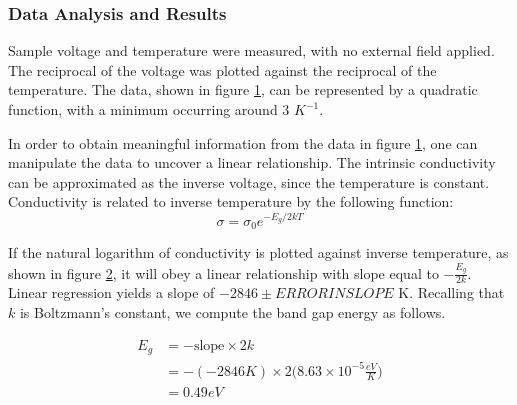 \documentclass[a4paper]{article}
\begin{document}
\subsubsection{Data Analysis and Results}
\qq Sample voltage and temperature were measured, with no external
field applied. The reciprocal of the voltage was plotted against the
reciprocal of the temperature. The data, shown in figure
\ref{task23plot}, can be represented by a quadratic function, with a
minimum occurring around 3 $K^{-1}$.

\begin{figure}[H]
\centering
\label{task23plot}
\end{figure}

\qq In order to obtain meaningful information from the data in figure
\ref{task23plot}, one can manipulate the data to uncover a linear
relationship. The intrinsic conductivity can be approximated as the
inverse voltage, since the temperature is constant. Conductivity is
related to inverse temperature by the following function:
$$\sigma = \sigma_0 e^{-E_g/2kT}$$

\begin{figure}[H]
\centering
\label{task23plotLINEAR}
\end{figure}

\qq If the natural logarithm of conductivity is plotted against
inverse temperature, as shown in figure \ref{task23plotLINEAR}, it
will obey a linear relationship with slope equal to $-
\frac{E_g}{2k}$. Linear regression yields a slope of $-2846 \pm
ERRORINSLOPE$ K. Recalling that $k$ is Boltzmann's constant, we
compute the band gap energy as follows.

\begin{align*}
E_g &= - \text{slope} \times 2k \\
    &= - (-2846 K) \times 2 
       \Big( 8.63 \times 10^{-5} \frac{eV}{K} \Big) \\
    &= 0.49 eV \\
\end{align*}
\end{document}
